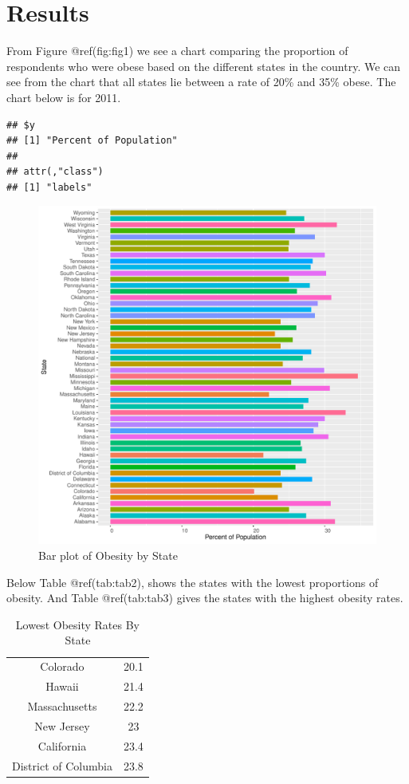 \documentclass[
]{article}
\begin{document}
\newpage

\hypertarget{Results}{%
\section{Results}\label{Results}}

From Figure @ref(fig:fig1) we see a chart comparing the proportion of
respondents who were obese based on the different states in the country.
We can see from the chart that all states lie between a rate of 20\% and
35\% obese. The chart below is for 2011.

\begin{verbatim}
## $y
## [1] "Percent of Population"
## 
## attr(,"class")
## [1] "labels"
\end{verbatim}

\begin{figure}
\centering
\includegraphics{paper_files/figure-latex/fig1-1.pdf}
\caption{Bar plot of Obesity by State}
\end{figure}

Below Table @ref(tab:tab2), shows the states with the lowest proportions
of obesity. And Table @ref(tab:tab3) gives the states with the highest
obesity rates.

\begin{table}

\caption{\label{tab:tab2}Lowest Obesity Rates By State}
\centering
\begin{tabular}[t]{cc}
\toprule
Colorado & 20.1\\
Hawaii & 21.4\\
Massachusetts & 22.2\\
New Jersey & 23\\
California & 23.4\\
\addlinespace
District of Columbia & 23.8\\
\bottomrule
\end{tabular}
\end{table}
\end{document}
